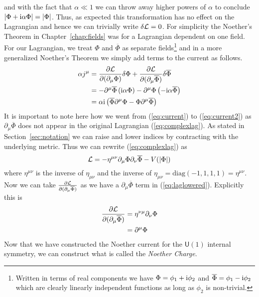 and with the fact that \(\alpha \ll 1\) we can throw away higher powers of
\(\alpha\) to conclude \(|\Phi + \mathrm{i}\alpha\Phi| = |\Phi|\). Thus, as expected
this transformation has no effect on the Lagrangian and hence we can trivially
write \(\delta\mathcal{L} = 0\). For simplicity the Noether's Theorem in
Chapter~\ref{chap:fields} was for a Lagrangian dependent on one field. For our
Lagrangian, we treat \(\Phi\) and \(\overline{\Phi}\) as separate
fields\footnote{Written in terms of real components we have \(\Phi = \phi_1 + \mathrm{i}\phi_2\)
and \(\overline{\Phi} = \phi_1 - \mathrm{i}\phi_2\) which are clearly linearly
independent functions as long as \(\phi_2\) is non-trivial.} and in a more
generalized Noether's Theorem we simply add terms to the current as follows.
\begin{align}
    \alpha j^\mu & = \pdv{\mathcal{L}}{(\partial_\mu\Phi)}\delta\Phi + \pdv{\mathcal{L}}{(\partial_\mu\overline{\Phi})}\delta\overline{\Phi} \label{eq:current} \\
                 & = -\partial^\mu\overline{\Phi}\left(\mathrm{i}\alpha\Phi\right) - \partial^\mu\Phi\left(-\mathrm{i}\alpha\overline{\Phi}\right) \label{eq:current2}\\
                 & = \alpha\mathrm{i}\left(\overline{\Phi}\partial^\mu\Phi - \Phi\partial^\mu\overline{\Phi}\right)
\end{align}
It is important to note here how we went from (\ref{eq:current}) to
(\ref{eq:current2}) as \(\partial_\mu\overline{\Phi}\) does not appear in the
original Lagrangian (\ref{eq:complexlag}). As stated in
Section~\ref{sec:notation} we can raise and lower indices by contracting with
the underlying metric. Thus we can rewrite (\ref{eq:complexlag}) as
\begin{equation}\label{eq:laglowered}
    \mathcal{L} = -\eta^{\mu\nu}\partial_\mu\Phi\partial_\nu\overline{\Phi} - V(|\Phi|)
\end{equation}
where \(\eta^{\mu\nu}\) is the inverse of \(\eta_{\mu\nu}\) and the inverse of
\(\eta_{\mu\nu} = \mathrm{diag}(-1,1,1,1) = \eta^{\mu\nu}\). Now we can take
\(\pdv{\mathcal{L}}{(\partial_\mu\overline{\Phi})}\) as we have a
\(\partial_\mu\overline{\Phi}\) term in (\ref{eq:laglowered}). Explicitly this
is
\begin{align}
    \pdv{\mathcal{L}}{(\partial_\mu\overline{\Phi})} & = \eta^{\nu\mu}\partial_\nu\Phi \\
                                              & = \partial^\mu\Phi
\end{align}
Now that we have constructed the Noether current for the \(\mathsf{U}(1)\)
internal symmetry, we can construct what is called the \textit{Noether Charge}.
